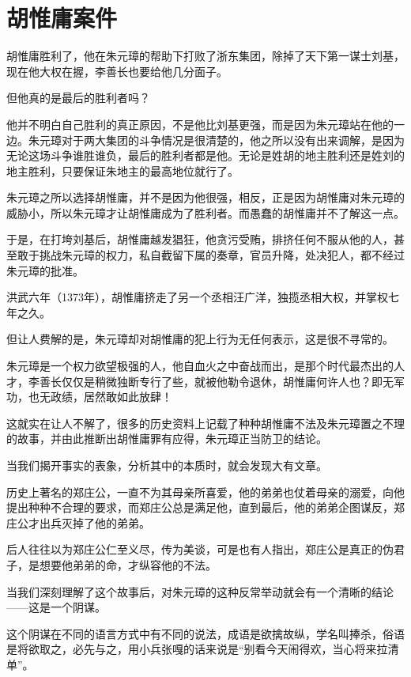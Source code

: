 \section{胡惟庸案件}
\ifnum{}
	\begin{multicols}{\theparacolNo}
		\fi
		胡惟庸胜利了，他在朱元璋的帮助下打败了浙东集团，除掉了天下第一谋士刘基，现在他大权在握，李善长也要给他几分面子。

		但他真的是最后的胜利者吗？

		他并不明白自己胜利的真正原因，不是他比刘基更强，而是因为朱元璋站在他的一边。朱元璋对于两大集团的斗争情况是很清楚的，他之所以没有出来调解，是因为无论这场斗争谁胜谁负，最后的胜利者都是他。无论是姓胡的地主胜利还是姓刘的地主胜利，只要保证朱地主的最高地位就行了。

		朱元璋之所以选择胡惟庸，并不是因为他很强，相反，正是因为胡惟庸对朱元璋的威胁小，所以朱元璋才让胡惟庸成为了胜利者。而愚蠢的胡惟庸并不了解这一点。

		于是，在打垮刘基后，胡惟庸越发猖狂，他贪污受贿，排挤任何不服从他的人，甚至敢于挑战朱元璋的权力，私自截留下属的奏章，官员升降，处决犯人，都不经过朱元璋的批准。

		洪武六年（1373年），胡惟庸挤走了另一个丞相汪广洋，独揽丞相大权，并掌权七年之久。

		但让人费解的是，朱元璋却对胡惟庸的犯上行为无任何表示，这是很不寻常的。

		朱元璋是一个权力欲望极强的人，他自血火之中奋战而出，是那个时代最杰出的人才，李善长仅仅是稍微独断专行了些，就被他勒令退休，胡惟庸何许人也？即无军功，也无政绩，居然敢如此放肆！

		这就实在让人不解了，很多的历史资料上记载了种种胡惟庸不法及朱元璋置之不理的故事，并由此推断出胡惟庸罪有应得，朱元璋正当防卫的结论。

		当我们揭开事实的表象，分析其中的本质时，就会发现大有文章。

		历史上著名的郑庄公，一直不为其母亲所喜爱，他的弟弟也仗着母亲的溺爱，向他提出种种不合理的要求，而郑庄公总是满足他，直到最后，他的弟弟企图谋反，郑庄公才出兵灭掉了他的弟弟。

		后人往往以为郑庄公仁至义尽，传为美谈，可是也有人指出，郑庄公是真正的伪君子，是想要他弟弟的命，才纵容他的不法。

		当我们深刻理解了这个故事后，对朱元璋的这种反常举动就会有一个清晰的结论——这是一个阴谋。

		这个阴谋在不同的语言方式中有不同的说法，成语是欲擒故纵，学名叫捧杀，俗语是将欲取之，必先与之，用小兵张嘎的话来说是“别看今天闹得欢，当心将来拉清单”。


\end{multicols}
